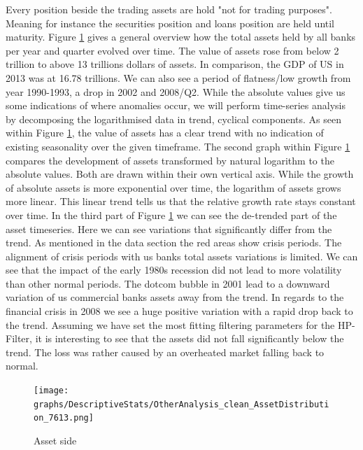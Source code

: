 \documentclass[12pt, a4paper]{article} %
\begin{document}
 Every position beside the trading assets are hold "not for trading purposes". Meaning for instance the securities position and loans position are held until maturity. 
 Figure \ref{fig:assets} gives a general overview how the total assets held by all banks per year and quarter evolved over time. The value of assets rose from below 2 trillion to above 13 trillions dollars of assets. In comparison, the GDP of US in 2013 was at 16.78 trillions. We can also see a period of flatness/low growth from  year 1990-1993, a drop in 2002 and 2008/Q2. While the absolute values give us some indications of where anomalies occur, we will perform time-series analysis by decomposing the logarithmised data in trend, cyclical components. As seen within Figure \ref{fig:assets}, the value of assets has a clear trend with no indication of existing seasonality over the given timeframe. The second graph within Figure \ref{fig:assets} compares the development of assets transformed by natural logarithm to the absolute values. Both are drawn within their own vertical axis. While the growth of absolute assets is more exponential over time, the logarithm of assets grows more linear. This linear trend tells us that the relative growth rate stays constant over time. In the third part of Figure \ref{fig:assets} we can see the de-trended part of the asset timeseries. Here we can see variations that significantly differ from the trend. As mentioned in the data section the red areas show crisis periods. The alignment of crisis periods with us banks total assets variations is limited. We can see that the impact of the early 1980s recession did not lead to more volatility than other normal periods. The dotcom bubble in 2001 lead to a downward variation of us commercial banks assets away from the trend. In regards to the financial crisis in 2008 we see a huge positive variation with a rapid drop back to the trend. Assuming we have set the most fitting filtering parameters for the HP-Filter, it is interesting to see that the assets did not fall significantly below the trend. The loss was rather caused by an overheated market falling back to normal.
 
  
\begin{figure}[hbtp]
\centering
\caption{Asset side}
\texttt{[image: graphs/DescriptiveStats/OtherAnalysis\_clean\_AssetDistribution\_7613.png]}
\label{fig:assets}
\end{figure}
\end{document}
